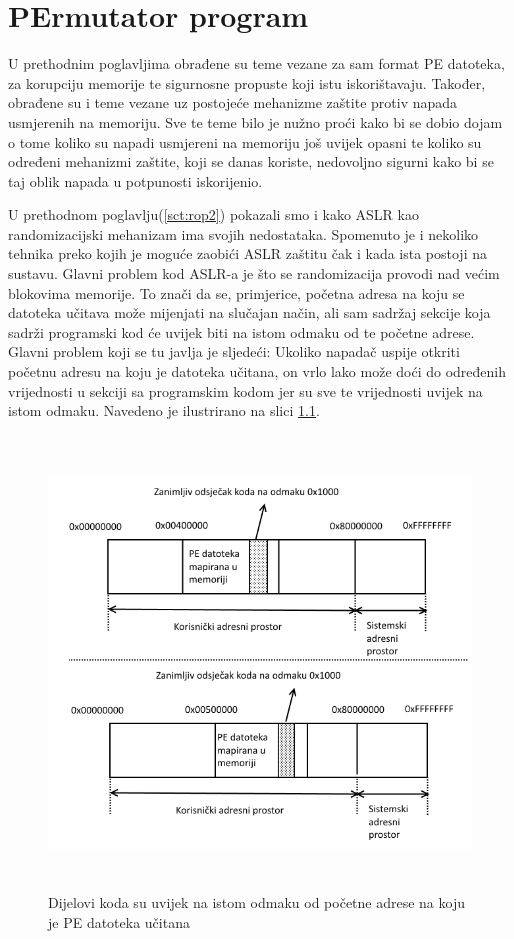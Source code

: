 \documentclass[times, utf8, diplomski, numeric]{fer}
\begin{document}
\chapter{PErmutator program}
\label{sct:permutator}
U prethodnim poglavljima obrađene su teme vezane za sam format PE
datoteka, za korupciju memorije te sigurnosne propuste koji istu
iskorištavaju. Također, obrađene su i teme vezane uz postojeće
mehanizme zaštite protiv napada usmjerenih na memoriju. Sve te			%
teme bilo je nužno proći kako bi se dobio dojam o tome koliko su
napadi usmjereni na memoriju još uvijek opasni te koliko su
određeni mehanizmi zaštite, koji se danas koriste, nedovoljno
sigurni kako bi se taj oblik napada u potpunosti iskorijenio.			%

U prethodnom poglavlju(\ref{sct:rop2}) pokazali smo i kako ASLR			%
kao randomizacijski mehanizam ima svojih nedostataka. Spomenuto
je i nekoliko tehnika preko kojih je moguće zaobići ASLR zaštitu
čak i kada ista postoji na sustavu. Glavni problem kod ASLR-a je
što se randomizacija provodi nad većim blokovima memorije. To
znači da se, primjerice, početna adresa na koju se datoteka
učitava može mijenjati na slučajan način, ali sam sadržaj sekcije
koja sadrži programski kod će uvijek biti na istom odmaku od te
početne adrese. Glavni problem koji se tu javlja je sljedeći:
Ukoliko napadač uspije otkriti početnu adresu na koju je datoteka
učitana, on vrlo lako može doći do određenih vrijednosti u
sekciji sa programskim kodom jer su sve te vrijednosti uvijek na
istom odmaku. Navedeno je ilustrirano na slici 
\ref{fig:aslr_permutacija}.

\begin{figure}[!htb]
\centering
\setlength\fboxsep{0pt}
\setlength\fboxrule{0.5pt}
\includegraphics[width=12cm, height=12cm]{slike/aslr_permutacija}
\caption{Dijelovi koda su uvijek na istom odmaku od početne adrese na koju je PE datoteka učitana}
\label{fig:aslr_permutacija} 
\end{figure}
\end{document}
